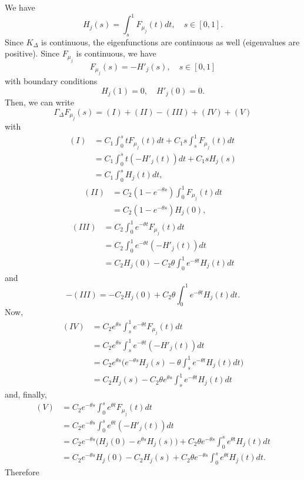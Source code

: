 \documentclass[aos]{imsart}
\theoremstyle{plain}
\theoremstyle{remark}
\newcommand{\1}{1}
\begin{document}
We have
\[
H_j(s)=\int_s^1 F_{\mu_j}(t)dt,\quad s\in [0,1].
\]
Since $K_\Delta$ is continuous, the eigenfunctions are continuous as well (eigenvalues are positive). 
Since $ F_{\mu_j}$ is continuous, we have
\[
 F_{\mu_j}(s)=-H'_j(s),\quad s\in [0,1]
\]
with boundary conditions
\[
H_j(1)=0,\quad H'_j(0)=0.
\]
Then, we can write
\[
\Gamma_\Delta F_{\mu_j}(s) =(I)+(II)-(III)+(IV)+(V)
\]
with
\begin{align*}
(I)&=C_1\int_0^s t F_{\mu_j}(t)dt+C_1s\int_s^1  F_{\mu_j}(t)dt\\
&=C_1\int_0^s t(-H'_j(t))dt+C_1sH_j(s)\\
&=C_1\int_0^sH_j(t)dt,
\end{align*}
\begin{align*}
(II)&=C_2(1-e^{-\theta s})\int_0^1 F_{\mu_j}(t)dt\\
&=C_2(1-e^{-\theta s})H_j(0),
\end{align*}
\begin{align*}
(III)&=C_2\int_0^1e^{-\theta t} F_{\mu_j}(t)dt\\
&=C_2\int_0^1e^{-\theta t}(-H'_j(t))dt\\
&=C_2H_j(0)-C_2\theta\int_0^1e^{-\theta t}H_j(t)dt
\end{align*}
and 
\[
-(III)=-C_2H_j(0)+C_2\theta\int_0^1e^{-\theta t}H_j(t)dt.
\]
Now,
\begin{align*}
(IV)&=C_2e^{\theta s}\int_s^1e^{-\theta t} F_{\mu_j}(t)dt\\
&=C_2e^{\theta s}\int_s^1e^{-\theta t}(-H'_j(t))dt\\
&=C_2e^{\theta s}\Big(e^{-\theta s}H_j(s)-\theta\int_s^1e^{-\theta t}H_j(t)dt\Big)\\
&=C_2H_j(s)-C_2\theta e^{\theta s}\int_s^1e^{-\theta t}H_j(t)dt
\end{align*}
and, finally,
\begin{align*}
(V)&=C_2e^{-\theta s}\int_0^se^{\theta t} F_{\mu_j}(t)dt\\
&=C_2e^{-\theta s}\int_0^se^{\theta t}(-H'_j(t))dt\\
&=C_2e^{-\theta s}\big(H_j(0)-e^{\theta s}H_j(s)\big)+C_2\theta e^{-\theta s}\int_0^se^{\theta t}H_j(t)dt\\
&=C_2e^{-\theta s}H_j(0)-C_2H_j(s)+C_2\theta e^{-\theta s}\int_0^se^{\theta t}H_j(t)dt.
\end{align*}
Therefore
\end{document}
